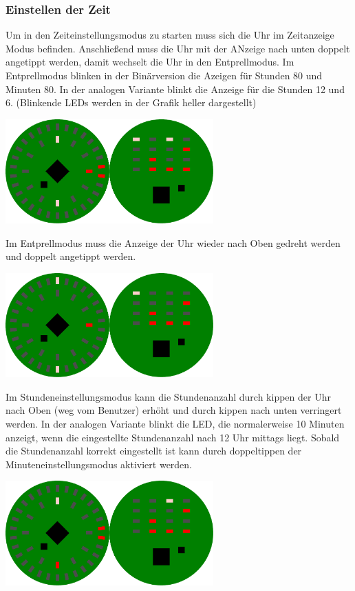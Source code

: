 \subsubsection{Einstellen der Zeit}
Um in den Zeiteinstellungsmodus zu starten muss sich die Uhr im Zeitanzeige Modus befinden. Anschließend muss die Uhr mit der ANzeige nach unten doppelt angetippt werden, damit wechselt die Uhr in den Entprellmodus. 
Im Entprellmodus blinken in der Binärversion die Azeigen für Stunden 80 und Minuten 80. In der analogen Variante blinkt die Anzeige für die Stunden 12 und 6. (Blinkende LEDs werden in der Grafik heller dargestellt)

\begin{center}
\includegraphics[width=0.6\textwidth]{../Graphics/Time3_15_debouncing}
\end{center}
Im Entprellmodus muss die Anzeige der Uhr wieder nach Oben gedreht werden und doppelt angetippt werden.
\begin{center}
\includegraphics[width=0.6\textwidth]{../Graphics/Time3_15_SetHour}
\end{center}
Im Stundeneinstellungsmodus kann die Stundenanzahl durch kippen der Uhr nach Oben (weg vom Benutzer) erhöht und durch kippen nach unten verringert werden. In der analogen Variante blinkt die LED, die normalerweise 10 Minuten anzeigt, wenn die eingestellte Stundenanzahl nach 12 Uhr mittags liegt.
Sobald die Stundenanzahl korrekt eingestellt ist kann durch doppeltippen der Minuteneinstellungsmodus aktiviert werden.
\begin{center}
\includegraphics[width=0.6\textwidth]{../Graphics/Time3_15_SetMinute}
\end{center}
